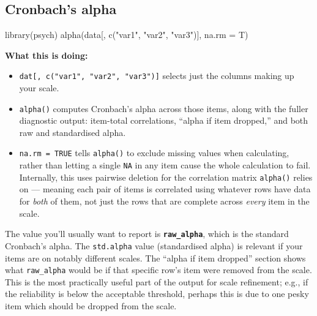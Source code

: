 \documentclass[
  letterpaper,
  DIV=11,
  numbers=noendperiod]{scrreprt}
\newenvironment{Shaded}{\begin{snugshade}}{\end{snugshade}}
\newcommand{\AttributeTok}[1]{\textcolor[rgb]{0.40,0.45,0.13}{#1}}
\newcommand{\FunctionTok}[1]{\textcolor[rgb]{0.28,0.35,0.67}{#1}}
\newcommand{\NormalTok}[1]{\textcolor[rgb]{0.00,0.23,0.31}{#1}}
\newcommand{\StringTok}[1]{\textcolor[rgb]{0.13,0.47,0.30}{#1}}
\begin{document}
\subsection{Cronbach's alpha}\label{cronbachs-alpha}

\begin{Shaded}
\begin{Highlighting}[]
\FunctionTok{library}\NormalTok{(psych)}
\FunctionTok{alpha}\NormalTok{(data[, }\FunctionTok{c}\NormalTok{(}\StringTok{"var1"}\NormalTok{, }\StringTok{"var2"}\NormalTok{, }\StringTok{"var3"}\NormalTok{)], }\AttributeTok{na.rm =}\NormalTok{ T)}
\end{Highlighting}
\end{Shaded}

\textbf{What this is doing:}

\begin{itemize}
\item
  \texttt{dat{[},\ c("var1",\ "var2",\ "var3"){]}} selects just the
  columns making up your scale.
\item
  \texttt{alpha()} computes Cronbach's alpha across those items, along
  with the fuller diagnostic output: item-total correlations, ``alpha if
  item dropped,'' and both raw and standardised alpha.
\item
  \texttt{na.rm\ =\ TRUE} tells \texttt{alpha()} to exclude missing
  values when calculating, rather than letting a single \texttt{NA} in
  any item cause the whole calculation to fail. Internally, this uses
  pairwise deletion for the correlation matrix \texttt{alpha()} relies
  on --- meaning each pair of items is correlated using whatever rows
  have data for \emph{both} of them, not just the rows that are complete
  across \emph{every} item in the scale.
\end{itemize}

\begin{tcolorbox}[enhanced jigsaw, toprule=.15mm, coltitle=black, colframe=quarto-callout-note-color-frame, colbacktitle=quarto-callout-note-color!10!white, opacityback=0, left=2mm, breakable, rightrule=.15mm, bottomrule=.15mm, leftrule=.75mm, titlerule=0mm, arc=.35mm, opacitybacktitle=0.6, toptitle=1mm, bottomtitle=1mm, title=\textcolor{quarto-callout-note-color}{\faInfo}\hspace{0.5em}{Reading the output}, colback=white]

The value you'll usually want to report is \textbf{\texttt{raw\_alpha}},
which is the standard Cronbach's alpha. The \texttt{std.alpha} value
(standardised alpha) is relevant if your items are on notably different
scales. The ``alpha if item dropped'' section shows what
\texttt{raw\_alpha} would be if that specific row's item were removed
from the scale. This is the most practically useful part of the output
for scale refinement; e.g., if the reliability is below the acceptable
threshold, perhaps this is due to one pesky item which should be dropped
from the scale.

\end{tcolorbox}
\end{document}
